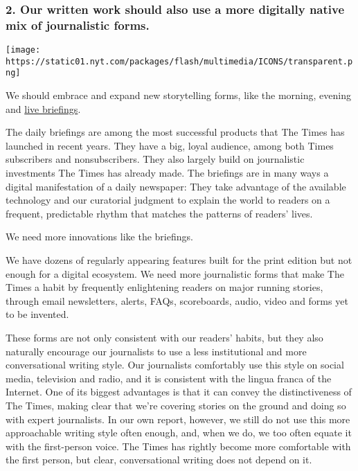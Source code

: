 \hypertarget{2-our-written-work-should-also-use-a-more-digitally-native-mix-of-journalistic-forms}{%
\subsubsection{2. Our written work should also use a more digitally
native mix of journalistic
forms.}\label{2-our-written-work-should-also-use-a-more-digitally-native-mix-of-journalistic-forms}}

\texttt{[image: https://static01.nyt.com/packages/flash/multimedia/ICONS/transparent.png]}

We should embrace and expand new storytelling forms, like the morning,
evening and
\href{https://www.nytimes.com/2017/01/12/us/politics/trump-cabinet-hearing.html}{live
briefings}.

The daily briefings are among the most successful products that The
Times has launched in recent years. They have a big, loyal audience,
among both Times subscribers and nonsubscribers. They also largely build
on journalistic investments The Times has already made. The briefings
are in many ways a digital manifestation of a daily newspaper: They take
advantage of the available technology and our curatorial judgment to
explain the world to readers on a frequent, predictable rhythm that
matches the patterns of readers' lives.

We need more innovations like the briefings.

We have dozens of regularly appearing features built for the print
edition but not enough for a digital ecosystem. We need more
journalistic forms that make The Times a habit by frequently
enlightening readers on major running stories, through email
newsletters, alerts, FAQs, scoreboards, audio, video and forms yet to be
invented.

These forms are not only consistent with our readers' habits, but they
also naturally encourage our journalists to use a less institutional and
more conversational writing style. Our journalists comfortably use this
style on social media, television and radio, and it is consistent with
the lingua franca of the Internet. One of its biggest advantages is that
it can convey the distinctiveness of The Times, making clear that we're
covering stories on the ground and doing so with expert journalists. In
our own report, however, we still do not use this more approachable
writing style often enough, and, when we do, we too often equate it with
the first-person voice. The Times has rightly become more comfortable
with the first person, but clear, conversational writing does not depend
on it.

